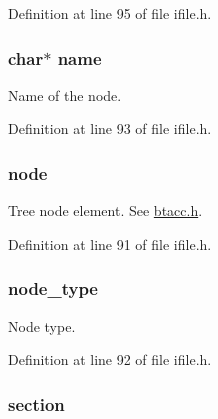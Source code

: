Definition at line 95 of file ifile.\-h.

\hypertarget{struct_i_n_i_f_i_l_e___n_o_d_e_a5ac083a645d964373f022d03df4849c8}{
\subsubsection[{name}]{\setlength{\rightskip}{0pt plus 5cm}char$\ast$ name}}\label{struct_i_n_i_f_i_l_e___n_o_d_e_a5ac083a645d964373f022d03df4849c8}


Name of the node. 



Definition at line 93 of file ifile.\-h.

\hypertarget{struct_i_n_i_f_i_l_e___n_o_d_e_acdebf5c3c6a27c5ebd53e9854ae24214}{
\subsubsection[{node}]{ node}}\label{struct_i_n_i_f_i_l_e___n_o_d_e_acdebf5c3c6a27c5ebd53e9854ae24214}


Tree node element. See \hyperlink{btacc_8h}{btacc.\-h}. 



Definition at line 91 of file ifile.\-h.

\hypertarget{struct_i_n_i_f_i_l_e___n_o_d_e_a34ffe3d3db8e7b7cece8b906af93eabc}{
\subsubsection[{node\-\_\-type}]{ node\-\_\-type}}\label{struct_i_n_i_f_i_l_e___n_o_d_e_a34ffe3d3db8e7b7cece8b906af93eabc}


Node type. 



Definition at line 92 of file ifile.\-h.

\hypertarget{struct_i_n_i_f_i_l_e___n_o_d_e_ad464719ecd66ed02d7177e79d78f08c0}{
\subsubsection[{section}]{ section}}\label{struct_i_n_i_f_i_l_e___n_o_d_e_ad464719ecd66ed02d7177e79d78f08c0}


